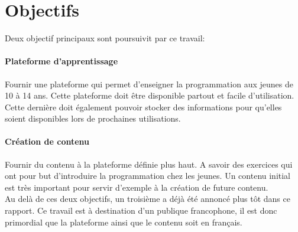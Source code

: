 \section{Objectifs}
\label{intro-objectifs}

Deux objectif principaux sont poursuivit par ce travail:

\paragraph{Plateforme d'apprentissage} Fournir une plateforme qui permet d'enseigner la programmation aux jeunes de 10 à 14 ans. Cette plateforme doit être disponible partout et facile d'utilisation. Cette dernière doit également pouvoir stocker des informations pour qu'elles soient disponibles lors de prochaines utilisations.

\paragraph{Création de contenu} Fournir du contenu à la plateforme définie plus haut. A savoir des exercices qui ont pour but d'introduire la programmation chez les jeunes. Un contenu initial est très important pour servir d'exemple à la création de future contenu.\\


Au delà de ces deux objectifs, un troisième a déjà été annoncé plus tôt dans ce rapport. Ce travail est à destination d'un publique francophone, il est donc primordial que la plateforme ainsi que le contenu soit en français.



%
%
%
%

